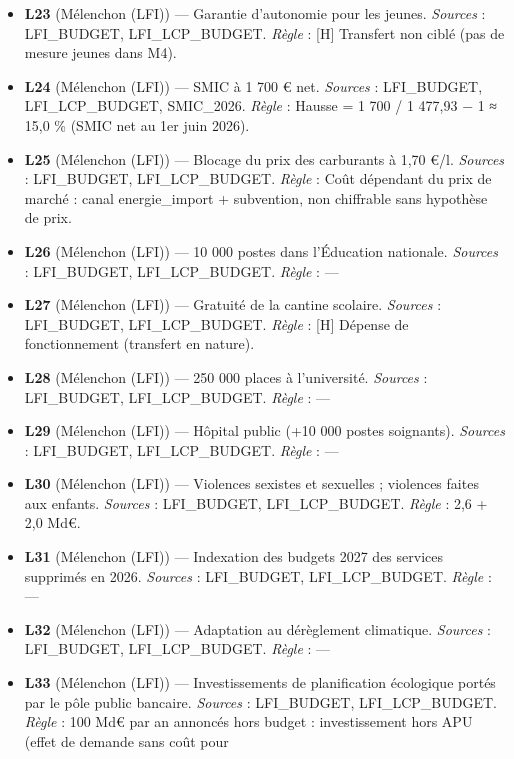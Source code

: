 \documentclass[
  11pt,
  11pt,
  a4paper,
  openany]{book}
\begin{document}
\begin{itemize}
  \emph{Règle} : ---
\item
  \textbf{L23} (Mélenchon (LFI)) --- Garantie d'autonomie pour les
  jeunes. \emph{Sources} : LFI\_BUDGET, LFI\_LCP\_BUDGET. \emph{Règle} :
  {[}H{]} Transfert non ciblé (pas de mesure jeunes dans M4).
\item
  \textbf{L24} (Mélenchon (LFI)) --- SMIC à 1 700 € net. \emph{Sources}
  : LFI\_BUDGET, LFI\_LCP\_BUDGET, SMIC\_2026. \emph{Règle} : Hausse = 1
  700 / 1 477,93 − 1 ≈ 15,0 \% (SMIC net au 1er juin 2026).
\item
  \textbf{L25} (Mélenchon (LFI)) --- Blocage du prix des carburants à
  1,70 €/l. \emph{Sources} : LFI\_BUDGET, LFI\_LCP\_BUDGET. \emph{Règle}
  : Coût dépendant du prix de marché : canal energie\_import +
  subvention, non chiffrable sans hypothèse de prix.
\item
  \textbf{L26} (Mélenchon (LFI)) --- 10 000 postes dans l'Éducation
  nationale. \emph{Sources} : LFI\_BUDGET, LFI\_LCP\_BUDGET.
  \emph{Règle} : ---
\item
  \textbf{L27} (Mélenchon (LFI)) --- Gratuité de la cantine scolaire.
  \emph{Sources} : LFI\_BUDGET, LFI\_LCP\_BUDGET. \emph{Règle} : {[}H{]}
  Dépense de fonctionnement (transfert en nature).
\item
  \textbf{L28} (Mélenchon (LFI)) --- 250 000 places à l'université.
  \emph{Sources} : LFI\_BUDGET, LFI\_LCP\_BUDGET. \emph{Règle} : ---
\item
  \textbf{L29} (Mélenchon (LFI)) --- Hôpital public (+10 000 postes
  soignants). \emph{Sources} : LFI\_BUDGET, LFI\_LCP\_BUDGET.
  \emph{Règle} : ---
\item
  \textbf{L30} (Mélenchon (LFI)) --- Violences sexistes et sexuelles ;
  violences faites aux enfants. \emph{Sources} : LFI\_BUDGET,
  LFI\_LCP\_BUDGET. \emph{Règle} : 2,6 + 2,0 Md€.
\item
  \textbf{L31} (Mélenchon (LFI)) --- Indexation des budgets 2027 des
  services supprimés en 2026. \emph{Sources} : LFI\_BUDGET,
  LFI\_LCP\_BUDGET. \emph{Règle} : ---
\item
  \textbf{L32} (Mélenchon (LFI)) --- Adaptation au dérèglement
  climatique. \emph{Sources} : LFI\_BUDGET, LFI\_LCP\_BUDGET.
  \emph{Règle} : ---
\item
  \textbf{L33} (Mélenchon (LFI)) --- Investissements de planification
  écologique portés par le pôle public bancaire. \emph{Sources} :
  LFI\_BUDGET, LFI\_LCP\_BUDGET. \emph{Règle} : 100 Md€ par an annoncés
  hors budget : investissement hors APU (effet de demande sans coût pour

\end{itemize}
\end{document}
